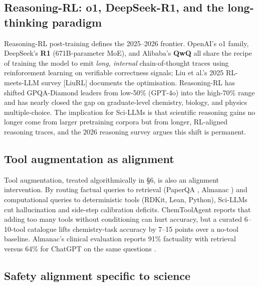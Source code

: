 \documentclass{article}
\begin{document}
\subsection{Reasoning-RL: o1, DeepSeek-R1, and the long-thinking paradigm}\label{reasoning-rl-o1-deepseek-r1-and-the-long-thinking-paradigm}

Reasoning-RL post-training defines the 2025--2026 frontier. OpenAI's o1 family, DeepSeek's \textbf{R1} (671B-parameter MoE), and Alibaba's \textbf{QwQ} all share the recipe of training the model to emit \emph{long, internal} chain-of-thought traces using reinforcement learning on verifiable correctness signals; Liu et al.'s 2025 RL-meets-LLM survey {[}LiuRL{]} documents the optimisation. Reasoning-RL has shifted GPQA-Diamond leaders from low-50\% (GPT-4o) into the high-70\% range and has nearly closed the gap on graduate-level chemistry, biology, and physics multiple-choice. The implication for Sci-LLMs is that scientific reasoning gains no longer come from larger pretraining corpora but from longer, RL-aligned reasoning traces, and the 2026 reasoning survey \cite{zhao2026appliedandcomputat} argues this shift is permanent.

\subsection{Tool augmentation as alignment}\label{tool-augmentation-as-alignment}

Tool augmentation, treated algorithmically in §6, is also an alignment intervention. By routing factual queries to retrieval (PaperQA \cite{ala2023arxiv2312075592023}, Almanac \cite{zakka2024almanacretrievalau}) and computational queries to deterministic tools (RDKit, Lean, Python), Sci-LLMs cut hallucination and side-step calibration deficits. ChemToolAgent \cite{yu2024chemtoolagenttheim} reports that adding too many tools without conditioning can hurt accuracy, but a curated 6--10-tool catalogue lifts chemistry-task accuracy by 7--15 points over a no-tool baseline. Almanac's clinical evaluation reports 91\% factuality with retrieval versus 64\% for ChatGPT on the same questions \cite{zakka2024almanacretrievalau}.

\subsection{Safety alignment specific to science}\label{safety-alignment-specific-to-science}
\end{document}
